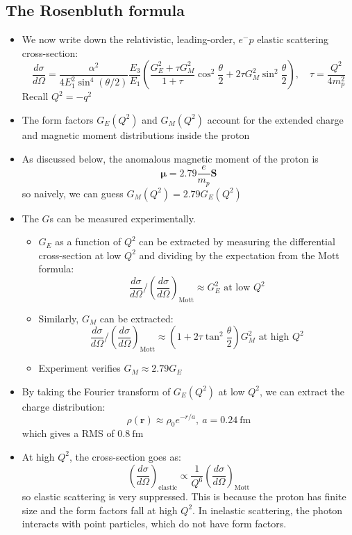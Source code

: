 \documentclass[11pt]{article}
\newcommand{\Se}{\mathbf{S}}
\newcommand{\vr}{\mathbf{r}}
\newcommand{\dd}[2]{\dfrac{d #1}{d #2}}
\newcommand{\fm}{\text{fm}}
\newcommand{\el}{\ensuremath{e^{-}}\xspace}
\begin{document}
\subsection{The Rosenbluth formula}
\begin{itemize}
  \item We now write down the relativistic, leading-order, $\el p$ elastic scattering cross-section:
  \begin{equation}
    \dd\sigma\Omega = \frac{\alpha^2}{4E_1^2\sin^4(\theta/2)}\frac{E_3}{E_1} \left(\frac{G_E^2+\tau G_M^2}{1+\tau}\cos^2\frac\theta 2 + 2\tau G_M^2\sin^2\frac\theta 2\right), \quad \tau = \frac{Q^2}{4m_p^2}
  \end{equation}
  Recall $Q^2 = -q^2$
  \item The form factors $G_E(Q^2)$ and $G_M(Q^2)$ account for the extended charge and magnetic moment distributions inside the proton
  \item As discussed below, the anomalous magnetic moment of the proton is
  \begin{equation}
    \bm\mu = 2.79 \frac{e}{m_p}\Se
  \end{equation}
  so naively, we can guess $G_M(Q^2) = 2.79 G_E(Q^2)$
  \item The $G$s can be measured experimentally. 
  \begin{itemize}
    \item $G_E$ as a function of $Q^2$ can be extracted by measuring the differential cross-section at low $Q^2$ and dividing by the expectation from the Mott formula:
    \begin{equation}
      \dd\sigma\Omega\Big/ \left(\dd\sigma\Omega\right)_\text{Mott} \approx G_E^2 \text{ at low }Q^2
    \end{equation}
    \item Similarly, $G_M$ can be extracted:
    \begin{equation}
      \dd\sigma\Omega\Big/ \left(\dd\sigma\Omega\right)_\text{Mott} \approx \left(1+2\tau\tan^2\frac\theta 2\right) G_M^2 \text{ at high }Q^2
    \end{equation}
    \item Experiment verifies $G_M \approx 2.79 G_E$
  \end{itemize}
  \item By taking the Fourier transform of $G_E(Q^2)$ at low $Q^2$, we can extract the charge distribution:
  \begin{equation}
    \rho(\vr) \approx \rho_0 e^{-r/a}, ~ a = 0.24~\fm
  \end{equation}
  which gives a RMS of $0.8~\fm$
  \item At high $Q^2$, the cross-section goes as:
  \begin{equation}
    \left(\dd\sigma\Omega\right)_\text{elastic} \propto \frac{1}{Q^6} \left(\dd\sigma\Omega\right)_\text{Mott}
  \end{equation}
  so elastic scattering is very suppressed. This is because the proton has finite size and the form factors fall at high $Q^2$. In inelastic scattering, the photon interacts with point particles, which do not have form factors.
\end{itemize}
\end{document}

